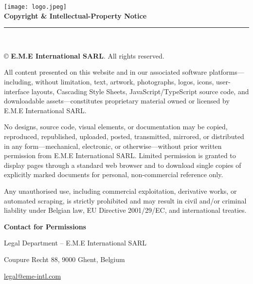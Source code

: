 \documentclass[12pt,a4paper]{article}
\begin{document}
\onehalfspacing

\begin{center}
  \vspace*{3cm}
  \texttt{[image: logo.jpeg]}\\[2cm]
  {\Large \textbf{Copyright \& Intellectual-Property Notice}}\\[1cm]
  \rule{\textwidth}{0.4pt}\\[1cm]
\end{center}

{\small
© \the\year{} \textbf{E.M.E International SARL}. All rights reserved.\par
\vspace{0.6cm}
All content presented on this website and in our associated software platforms—including, without limitation, text, artwork, photographs, logos, icons, user-interface layouts, Cascading Style Sheets, JavaScript/TypeScript source code, and downloadable assets—constitutes proprietary material owned or licensed by E.M.E International SARL.\par
\vspace{0.6cm}
No designs, source code, visual elements, or documentation may be copied, reproduced, republished, uploaded, posted, transmitted, mirrored, or distributed in any form—mechanical, electronic, or otherwise—without prior written permission from E.M.E International SARL. Limited permission is granted to display pages through a standard web browser and to download single copies of explicitly marked documents for personal, non-commercial reference only.\par
\vspace{0.6cm}
Any unauthorised use, including commercial exploitation, derivative works, or automated scraping, is strictly prohibited and may result in civil and/or criminal liability under Belgian law, EU Directive 2001/29/EC, and international treaties.\par
\vspace{1cm}
\textbf{Contact for Permissions}\par
Legal Department – E.M.E International SARL\par
Coupure Recht 88, 9000 Ghent, Belgium\par
\href{mailto:legal@eme-intl.com}{legal@eme-intl.com}
}
\end{document}
